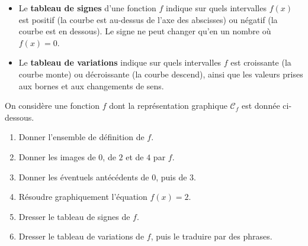 \documentclass[10pt,a4paper]{article}
\begin{document}
\begin{bloc}
\begin{defis}
\begin{itemize}
    \item Le \textbf{tableau de signes} d'une fonction \(f\) indique sur quels intervalles \(f(x)\) est positif (la courbe est au-dessus de l'axe des abscisses) ou négatif (la courbe est en dessous). Le signe ne peut changer qu'en un nombre où \(f(x)=0\).
    \item Le \textbf{tableau de variations} indique sur quels intervalles \(f\) est croissante (la courbe monte) ou décroissante (la courbe descend), ainsi que les valeurs prises aux bornes et aux changements de sens.
\end{itemize}
\end{defis}
\end{bloc}

\begin{bloc}
\begin{exple}
On considère une fonction \(f\) dont la représentation graphique \(\mathcal{C}_f\) est donnée ci-dessous.

\smallskip
\begin{minipage}{0.55\linewidth}
\centering
{}
\end{minipage}\hfill
\begin{minipage}{0.42\linewidth}
\begin{enumerate}[leftmargin=*]
    \item Donner l'ensemble de définition de \(f\).
    \item Donner les images de \(0\), de \(2\) et de \(4\) par \(f\).
    \item Donner les éventuels antécédents de \(0\), puis de \(3\).
    \item Résoudre graphiquement l'équation \(f(x)=2\).
    \item Dresser le tableau de signes de \(f\).
    \item Dresser le tableau de variations de \(f\), puis le traduire par des phrases.
\end{enumerate}
\end{minipage}
\end{exple}
\end{bloc}
\end{document}
